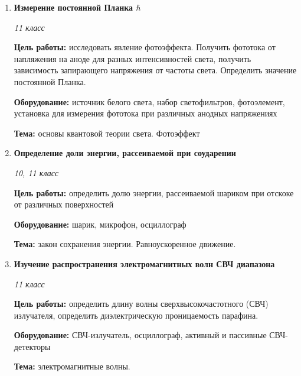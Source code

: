 \documentclass[a4paper,10pt]{article}
\newcommand{\labtitle}[5]{
	\textbf{#2}\par
	\textit{#1 класс}\par
	\textbf{Цель работы:} #3\par
	\textbf{Оборудование:} #4\par
	\textbf{Тема:} #5
}
\begin{document}
\begin{enumerate}
		{вольт-амперная характеристика. }
	\item \labtitle
		{11}
		{Измерение постоянной Планка $\hbar$}
		{исследовать явление фотоэффекта. Получить фототока от напляжения на аноде для разных интенсивностей света, получить зависимость запирающего напряжения от частоты света. Определить значение постоянной Планка.}
		{источник белого света, набор светофильтров, фотоэлемент, установка для измерения фототока при различных анодных напряжениях}
		{основы квантовой теории света. Фотоэффект}
	\item \labtitle
		{10, 11}
		{Определение доли энергии, рассеиваемой при соударении}
		{определить долю энергии, рассеиваемой шариком при отскоке от различных поверхностей}
		{шарик, микрофон, осциллограф}
		{закон сохранения энергии. Равноускоренное движение.}
	\item \labtitle
		{11}
		{Изучение распространения электромагнитных волн СВЧ диапазона}
		{определить длину волны сверхвысокочастотного (СВЧ) излучателя, определить диэлектрическую проницаемость парафина.}
		{СВЧ-излучатель, осциллограф, активный и пассивные СВЧ-детекторы}
		{электромагнитные волны.}

\end{enumerate}
\end{document}
